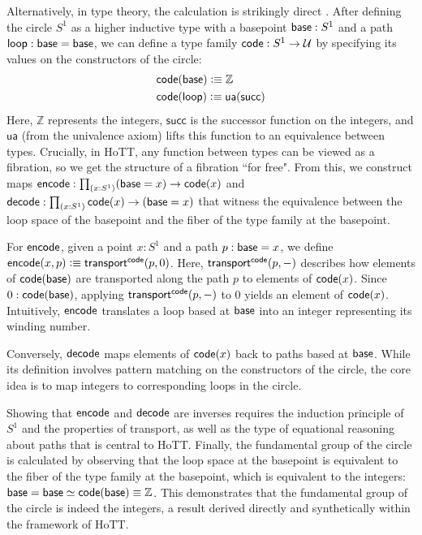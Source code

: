 \documentclass[main.tex]{subfiles}
\begin{document}
Alternatively, in type theory, the calculation is strikingly direct \cite{licata_shulman_fundamental}. After defining the circle $S^1$ as a higher inductive type with a basepoint $\mathsf{base} : S^1$ and a path $\mathsf{loop} : \mathsf{base} = \mathsf{base}$, we can define a type family $\mathsf{code} : S^1 \to \mathcal{U}$ by specifying its values on the constructors of the circle:
\begin{align*}
	&\mathsf{code}(\mathsf{base}) \vcentcolon\equiv \mathbb{Z} \\
	&\mathsf{code}(\mathsf{loop}) \vcentcolon\equiv \mathsf{ua}(\mathsf{succ})
\end{align*}
Here, $\mathbb{Z}$ represents the integers, $\mathsf{succ}$ is the successor function on the integers, and $\mathsf{ua}$ (from the univalence axiom) lifts this function to an equivalence between types. Crucially, in HoTT, any function between types can be viewed as a fibration, so we get the structure of a fibration ``for free". From this, we construct maps $\eco : \prd{x:S^1}(\ba = x) \to \co(x)$ and $\dco : \prd{x : S^1}\co(x) \to (\ba = x)$ that witness the equivalence between the loop space of the basepoint and the fiber of the type family at the basepoint.

For $\mathsf{encode}$, given a point $x:S^1$ and a path $p : \mathsf{base} = x$, we define $\mathsf{encode}(x,p) \vcentcolon\equiv \mathsf{transport}^{\mathsf{code}}(p,0)$. Here, $\mathsf{transport}^{\mathsf{code}}(p,-)$ describes how elements of $\mathsf{code}(\mathsf{base})$ are transported along the path $p$ to elements of $\mathsf{code}(x)$. Since $0 : \mathsf{code}(\mathsf{base})$, applying $\mathsf{transport}^{\mathsf{code}}(p,-)$ to $0$ yields an element of $\mathsf{code}(x)$. Intuitively, $\mathsf{encode}$ translates a loop based at $\mathsf{base}$ into an integer representing its winding number.

Conversely, $\mathsf{decode}$ maps elements of $\mathsf{code}(x)$ back to paths based at $\mathsf{base}$. While its definition involves pattern matching on the constructors of the circle, the core idea is to map integers to corresponding loops in the circle.

Showing that $\mathsf{encode}$ and $\mathsf{decode}$ are inverses requires the induction principle of $S^1$ and the properties of transport, as well as the type of equational reasoning about paths that is central to HoTT. Finally, the fundamental group of the circle is calculated by observing that the loop space at the basepoint is equivalent to the fiber of the type family at the basepoint, which is equivalent to the integers: $\mathsf{base} = \mathsf{base} \simeq \mathsf{code}(\mathsf{base}) \equiv \mathbb{Z}$. This demonstrates that the fundamental group of the circle is indeed the integers, a result derived directly and synthetically within the framework of HoTT.
\end{document}
